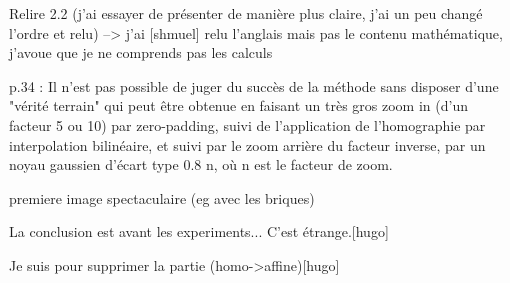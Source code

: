 Relire 2.2 (j’ai essayer de présenter de manière plus claire, j’ai un peu changé l’ordre et relu)
--> j'ai [shmuel] relu l'anglais mais pas le contenu mathématique, j'avoue que je ne comprends pas les calculs

p.34 : Il n'est pas possible de juger du succès de la méthode sans disposer d'une "vérité terrain" qui peut être obtenue en faisant un très gros zoom in (d'un facteur 5 ou 10) par zero-padding, suivi de l'application de l'homographie par interpolation bilinéaire, et suivi par le zoom arrière du facteur inverse, par un noyau gaussien d'écart type 0.8 n, où n est  le facteur de zoom.

premiere image spectaculaire (eg avec les briques)

La conclusion est avant les experiments... C'est étrange.[hugo]

Je suis pour supprimer la partie (homo->affine)[hugo]
